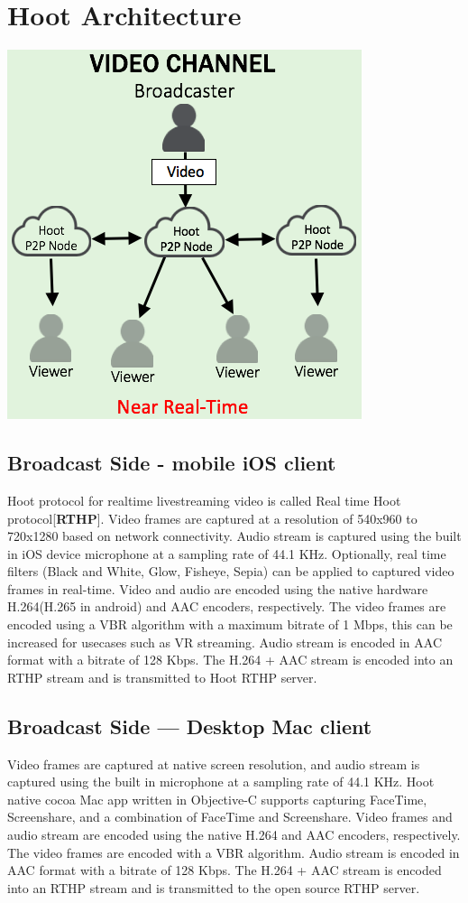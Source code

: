 \section{Hoot Architecture}

\includegraphics[scale=0.5]{hoot-video-architecture-channel}

\subsection{Broadcast Side - mobile iOS client}
Hoot protocol for realtime livestreaming video is called Real time Hoot protocol[\textbf{RTHP}].
Video frames are captured at a resolution of 540x960 to 720x1280 based on network connectivity. Audio stream is captured using the built in iOS device microphone at a sampling rate of 44.1 KHz. Optionally, real time filters (Black and White, Glow, Fisheye, Sepia) can be applied to captured video frames in real-time. Video and audio are encoded using the native hardware H.264(H.265 in android) and AAC encoders, respectively.  The video frames are encoded using a VBR algorithm with a maximum bitrate of 1 Mbps, this can be increased for usecases such as VR streaming. Audio stream is encoded in AAC format with a bitrate of 128 Kbps. The H.264 + AAC stream is encoded into an RTHP stream and is transmitted to Hoot RTHP server.

\subsection{Broadcast Side — Desktop Mac client}
Video frames are captured at native screen resolution, and audio stream is captured using the built in microphone at a sampling rate of 44.1 KHz. Hoot native cocoa Mac app written in Objective-C supports capturing FaceTime, Screenshare, and a combination of FaceTime and Screenshare. Video frames and audio stream are encoded using the native H.264 and AAC encoders, respectively. The video frames are encoded with a VBR algorithm. Audio stream is encoded in AAC format with a bitrate of 128 Kbps. The H.264 + AAC stream is encoded into an RTHP stream and is transmitted to the open source RTHP server.

